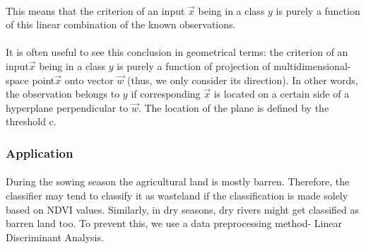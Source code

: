 \documentclass[12pt, a4paper]{report}
\begin{document}
\paragraph{}
This means that the criterion of an input ${\displaystyle {\vec {x}}}$ being in a class $y$ is purely a function of this linear combination of the known observations.
\paragraph{}
It is often useful to see this conclusion in geometrical terms: the criterion of an input${\displaystyle {\vec {x}}}$ being in a class $y$ is purely a function of projection of multidimensional-space point${\displaystyle {\vec {x}}}$ onto vector ${\displaystyle {\vec {w}}}$ (thus, we only consider its direction). In other words, the observation belongs to $y$ if corresponding ${\displaystyle {\vec {x}}}$ is located on a certain side of a hyperplane perpendicular to ${\displaystyle {\vec {w}}}$. The location of the plane is defined by the threshold c.\cite{ldaonetwo}

\subsubsection{Application}
\paragraph{}
 During the sowing season the agricultural land is mostly barren. Therefore, the classifier may tend to classify it as wasteland if the classification is made solely based on NDVI values. Similarly, in dry seasons, dry rivers might get classified as barren land too. To prevent this, we use a data preprocessing method- Linear Discriminant Analysis.
\end{document}
